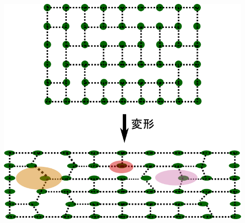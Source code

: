 \documentclass[12pt, dvipdfmx]{beamer}
\begin{document}
\begin{frame}
\begin{columns}[totalwidth=1\textwidth]
\begin{itemize}
                \end{itemize}
				\includegraphics[width=\textwidth]{random_NW.png}
		\end{columns}
\end{frame}
\end{document}
